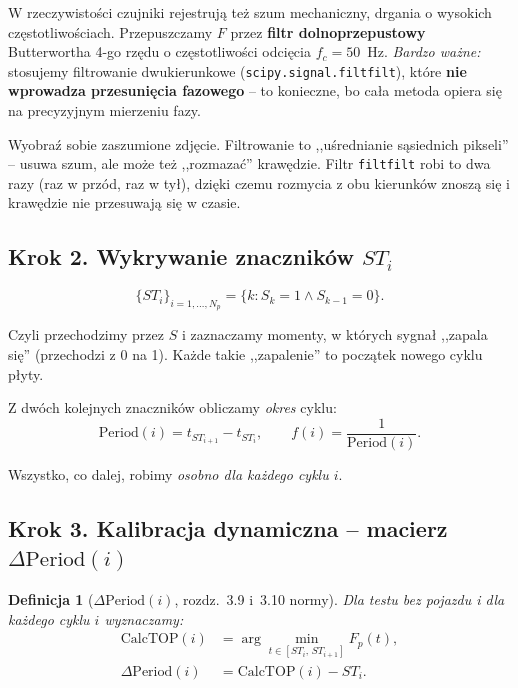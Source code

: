 \documentclass[11pt,a4paper]{article}
\theoremstyle{plainpol}
\newtheorem{definicja}{Definicja}[section]
\begin{document}
W rzeczywistości czujniki rejestrują też szum mechaniczny, drgania
o wysokich częstotliwościach. Przepuszczamy $F$ przez \textbf{filtr
dolnoprzepustowy} Butterwortha 4-go rzędu o częstotliwości odcięcia
$f_c = 50$~Hz. \emph{Bardzo ważne:} stosujemy filtrowanie dwukierunkowe
(\texttt{scipy.signal.filtfilt}), które \textbf{nie wprowadza
przesunięcia fazowego} -- to konieczne, bo cała metoda opiera się na
precyzyjnym mierzeniu fazy.

\begin{intuicja}
Wyobraź sobie zaszumione zdjęcie. Filtrowanie to ,,uśrednianie sąsiednich
pikseli'' -- usuwa szum, ale może też ,,rozmazać'' krawędzie. Filtr
\texttt{filtfilt} robi to dwa razy (raz w przód, raz w tył), dzięki czemu
rozmycia z obu kierunków znoszą się i krawędzie nie przesuwają się
w czasie.
\end{intuicja}

\subsection{Krok 2. Wykrywanie znaczników $ST_i$}

\begin{equation}
  \{ST_i\}_{i=1,\ldots,N_p} = \{k\colon S_k = 1 \wedge S_{k-1} = 0\}.
\end{equation}

Czyli przechodzimy przez $S$ i zaznaczamy momenty, w których sygnał
,,zapala się'' (przechodzi z 0 na 1). Każde takie ,,zapalenie'' to
początek nowego cyklu płyty.

Z dwóch kolejnych znaczników obliczamy \emph{okres} cyklu:
\begin{equation}
  \mathrm{Period}(i) = t_{ST_{i+1}} - t_{ST_i}, \qquad f(i) = \dfrac{1}{\mathrm{Period}(i)}.
\end{equation}

Wszystko, co dalej, robimy \emph{osobno dla każdego cyklu $i$}.

\subsection{Krok 3. Kalibracja dynamiczna -- macierz $\Delta\mathrm{Period}(i)$}\label{sec:kalibracja}

\begin{definicja}[$\Delta\mathrm{Period}(i)$, rozdz.~3.9 i~3.10 normy]
Dla testu \emph{bez pojazdu} i dla każdego cyklu $i$ wyznaczamy:
\begin{align}
  \mathrm{CalcTOP}(i) &= \arg\min_{t\in[ST_i,\,ST_{i+1}]} F_p(t), \\
  \Delta\mathrm{Period}(i) &= \mathrm{CalcTOP}(i) - ST_i.
\end{align}
\end{definicja}
\end{document}
